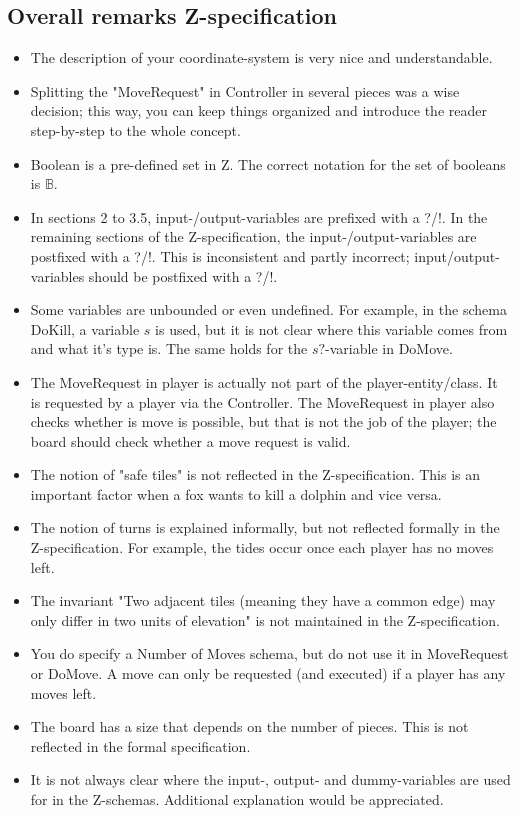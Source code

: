 \documentclass[a4paper,11pt]{article}
\begin{document}
    \subsection{Overall remarks Z-specification}
    \begin{itemize}
        \item The description of your coordinate-system is very nice and understandable.
        \item Splitting the "MoveRequest" in Controller in several pieces was a wise decision; this way, you can keep things organized and introduce the reader step-by-step to the whole concept.
        \item Boolean is a pre-defined set in Z. The correct notation for the set of booleans is $\mathds{B}$.
        \item In sections 2 to  3.5, input-/output-variables are prefixed with a ?/!. In the remaining sections of the Z-specification, the input-/output-variables are postfixed with a ?/!. This is inconsistent and partly incorrect; input/output-variables should be postfixed with a ?/!.
        \item Some variables are unbounded or even undefined. For example, in the schema DoKill, a variable $s$ is used, but it is not clear where this variable comes from and what it's type is. The same holds for the $s?$-variable in DoMove.
        \item The MoveRequest in player is actually not part of the player-entity/class. It is requested by a player via the Controller. The MoveRequest in player also checks whether is move is possible, but that is not the job of the player; the board should check whether a move request is valid.
        \item The notion of "safe tiles" is not reflected in the Z-specification. This is an important factor when a fox wants to kill a dolphin and vice versa.
        \item The notion of turns is explained informally, but not reflected formally in the Z-specification. For example, the tides occur once each player has no moves left.
        \item The invariant "Two adjacent tiles (meaning they have a common edge) may only differ in two units of elevation" is not maintained in the Z-specification.
        \item You do specify a Number of Moves schema, but do not use it in MoveRequest or DoMove. A move can only be requested (and executed) if a player has any moves left.
        \item The board has a size that depends on the number of pieces. This is not reflected in the formal specification.
        \item It is not always clear where the input-, output- and dummy-variables are used for in the Z-schemas. Additional explanation would be appreciated.
    \end{itemize}
\end{document}

